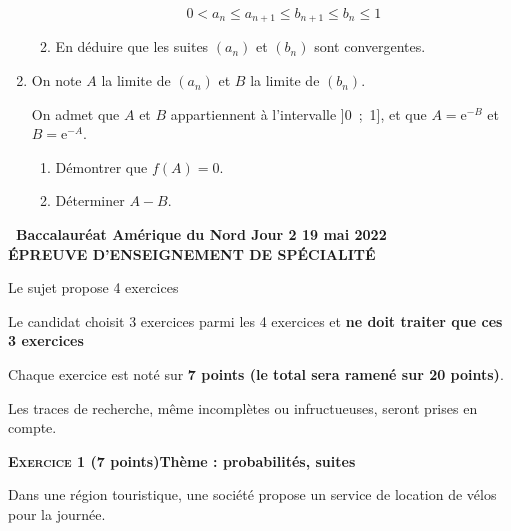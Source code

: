 \documentclass[10pt,a4paper]{article}
\begin{document}
\begin{enumerate}
\begin{enumerate}
		\[0 < a_n \leqslant a_{n+1} \leqslant b_{n+1} \leqslant b_n \leqslant 1\]
		
		\item En déduire que les suites $\left(a_n\right)$ et $\left(b_n\right)$ sont convergentes.
	\end{enumerate}	
\item On note $A$ la limite de $\left(a_n\right)$ et $B$ la limite de $\left(b_n\right)$.

On admet que $A$ et $B$ appartiennent à l'intervalle ]0~;~1], et que $A = \text{e}^{-B}$ et $B = \text{e}^{-A}$.
	\begin{enumerate}
		\item Démontrer que $f(A) = 0$.
		\item Déterminer $A - B$.
	\end{enumerate}
\end{enumerate}
\newpage
\hypertarget{AmeriqueNord2}{}

\label{AmeriqueNord2}

\pagestyle{fancy}
\thispagestyle{empty}

\begin{center}{\Large\textbf{\decofourleft~Baccalauréat Amérique du Nord Jour 2 19 mai 2022~\decofourright\\[6pt] ÉPREUVE D'ENSEIGNEMENT DE SPÉCIALITÉ}}
\end{center}

\vspace{0,25cm}

Le sujet propose 4 exercices

Le candidat choisit 3 exercices parmi les 4 exercices et \textbf{ne doit traiter que ces 3 exercices}

Chaque exercice est noté sur \textbf{7 points (le total sera ramené sur 20 points)}.

Les traces de recherche, même incomplètes ou infructueuses, seront prises en compte.

\bigskip

\textbf{\textsc{Exercice 1} \quad (7 points)\hfill Thème : probabilités, suites}

\medskip

Dans une région touristique, une société propose un service de location de vélos pour la journée.

\smallskip
\end{document}
